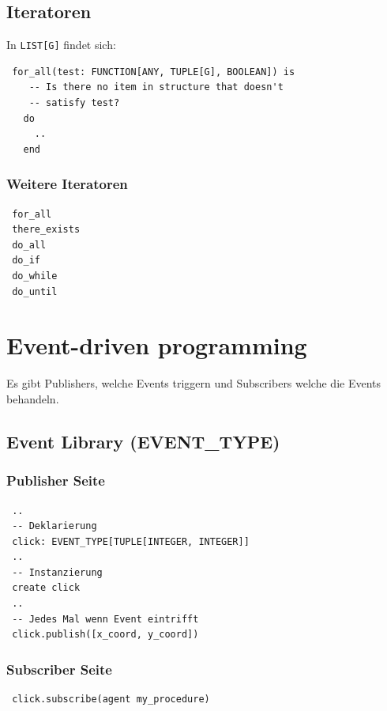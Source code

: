 \documentclass[german, 10pt, a4paper, twocolumn]{scrartcl}
\theoremstyle{definition}
\begin{document}
\subsection{Iteratoren}

In \verb#LIST[G]# findet sich:

\begin{verbatim}
 for_all(test: FUNCTION[ANY, TUPLE[G], BOOLEAN]) is
    -- Is there no item in structure that doesn't
    -- satisfy test?
   do
     ..
   end
\end{verbatim}

\subsubsection{Weitere Iteratoren}

\begin{verbatim}
 for_all
 there_exists
 do_all
 do_if
 do_while
 do_until
\end{verbatim}

\section{Event-driven programming}

Es gibt Publishers, welche Events triggern und Subscribers welche die Events behandeln.

\subsection{Event Library (EVENT\_TYPE)}


\subsubsection{Publisher Seite}

\begin{verbatim}
 ..
 -- Deklarierung
 click: EVENT_TYPE[TUPLE[INTEGER, INTEGER]]
 ..
 -- Instanzierung
 create click
 ..
 -- Jedes Mal wenn Event eintrifft
 click.publish([x_coord, y_coord])
\end{verbatim}

\subsubsection{Subscriber Seite}

\begin{verbatim}
 click.subscribe(agent my_procedure)
\end{verbatim}
\end{document}
